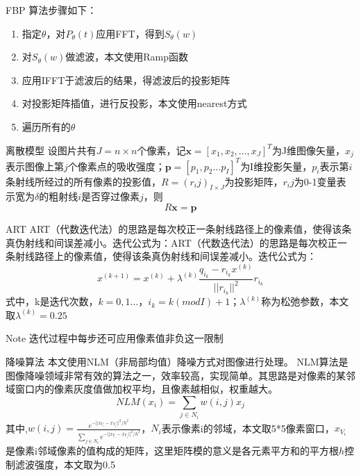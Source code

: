 \documentclass{beamer}
\begin{document}
\begin{frame}{FBP}
	算法步骤如下：
	\begin{enumerate}
		\item 指定$\theta$，对\(P_\theta (t)\)应用FFT，得到\(S_\theta (w)\)
		\item 对\(S_\theta (w)\)做滤波，本文使用Ramp函数
		\item 应用IFFT于滤波后的结果，得滤波后的投影矩阵
		\item 对投影矩阵插值，进行反投影，本文使用nearest方式
		\item 遍历所有的$\theta$
	\end{enumerate}
\end{frame}

\begin{frame}{离散模型}
	设图片共有\(J = n\times n\)个像素，记$\textbf{x}=[x_{1},x_{2} ,\ldots ,x_{J}]^T$为J维图像矢量，\(x_j\)表示图像上第\(j\)个像素点的吸收强度；$\textbf{p}=[p_{1},p_{2} \ldots p_{I}]^T$为I维投影矢量，$p_i$表示第\(i\)条射线所经过的所有像素的投影值，$R=(r_ij)_{I\times J}$为投影矩阵，\(r_ij\)为0-1变量表示宽为\(\delta\)的粗射线\(i\)是否穿过像素\(j\)，则
	\begin{equation}
		R\textbf{x}=\textbf{p}
	\end{equation}
\end{frame}

\begin{frame}{ART}
	ART（代数迭代法）的思路是每次校正一条射线路径上的像素值，使得该条真伪射线和间误差减小。迭代公式为：ART（代数迭代法）的思路是每次校正一条射线路径上的像素值，使得该条真伪射线和间误差减小。迭代公式为：
	\begin{equation}
		x^{(k+1)}=x^{(k)}+\lambda^{(k)}\frac{q_{i_{k}}-r_{i_{k}}x^{(k)}}{||r_{i_{k}}||^{2}}r_{i_{k}}
	\end{equation}
	式中，k是迭代次数，$k=0,1 \ldots$，$i_{k}=k(modI)+1$；$\lambda^{(k)}$称为松弛参数，本文取$\lambda^{(k)}=0.25$
	\begin{alertblock}{Note}
		迭代过程中每步还可应用像素值非负这一限制
	\end{alertblock}
\end{frame}

\begin{frame}{降噪算法}
	本文使用NLM（非局部均值）降噪方式对图像进行处理。 NLM算法是图像降噪领域非常有效的算法之一，效率较高，实现简单。其思路是对像素的某邻域窗口内的像素灰度值做加权平均，且像素越相似，权重越大。
	\begin{equation}
		NLM(x_{i})=\sum_{j\in N_{i}} w(i,j)x_{j}
	\end{equation}
	其中,\(w(i,j)=\frac{e^{-||x_{V_{i}}-x_{V_{j}}||^2/h^2}}{\sum_{j\in N_{i}}e^{-||x_{V_{i}}-x_{V_{j}}||^2/h^2}}\)，$N_{i}$表示像素i的邻域，本文取5*5像素窗口，$x_{V_{i}}$是像素i邻域像素的值构成的矩阵，这里矩阵模的意义是各元素平方和的平方根$h$控制滤波强度，本文取为0.5
\end{frame}
\end{document}
